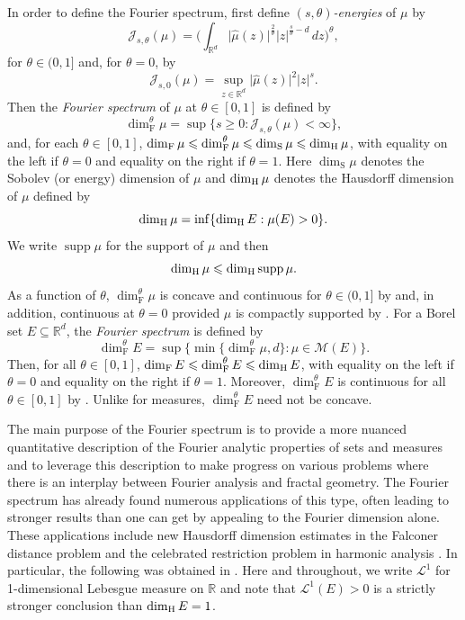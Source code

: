 \documentclass[11pt]{amsart}
\numberwithin{equation}{section}
\newcommand{\rd}{\mathbb{R}^d}
\newcommand{\M}{\mathcal{M}}
\renewcommand{\geq}{\geqslant}
\renewcommand{\leq}{\leqslant}
\newcommand{\hd}{\dim_{\textup{H}}}
\newcommand{\fs}{\dim^\theta_{\mathrm{F}}}
\newcommand{\fd}{\dim_{\mathrm{F}}}
\newcommand{\sd}{\dim_{\mathrm{S}}}
\newcommand{\J}{\mathcal{J}}
\newcommand{\spt}{\operatorname{supp}}
\theoremstyle{plain}
\theoremstyle{remark}
\begin{document}
In order to define the Fourier spectrum,  first define \emph{$(s,\theta)$-energies} of  $\mu$  by
\begin{equation*}
	\J_{s,\theta}(\mu) = \bigg( \int_{\rd} \big| \widehat{\mu}(z) \big|^{\frac{2}{\theta}}|z|^{\frac{s}{\theta}-d}\,dz \bigg)^\theta,
\end{equation*}
for $\theta \in (0,1]$ 
and, for $\theta = 0$, by
\begin{equation*}
	\J_{s,0}(\mu) = \sup_{z\in\rd} \big| \widehat{\mu}(z) \big|^2|z|^{s}.
\end{equation*}
Then the \emph{Fourier spectrum} of $\mu$ at $\theta \in [0,1]$ is defined by
\begin{equation*}
	\fs \mu = \sup\{ s \geq 0 : \J_{s,\theta}(\mu)<\infty \},
\end{equation*}
and, for each $\theta\in[0,1]$, $\fd \mu\leq\fs \mu\leq\sd \mu \leq \hd \mu$, with equality on the left if $\theta= 0$ and equality on the right if $\theta = 1$. Here $\sd \mu$ denotes the Sobolev (or energy) dimension of $\mu$ and $\hd \mu$ denotes the Hausdorff dimension of $\mu$ defined by
\[
\hd \mu = \inf\{ \hd E : \mu(E)>0\}.
\]
We write $\spt \mu$ for the support of $\mu$ and then
\[
\hd \mu \leq \hd \spt \mu.
\]
As a function of $\theta$, $\fs\mu$ is concave and continuous for $\theta\in(0,1]$ by \cite[Theorem~1.1]{JMF} and, in addition,  continuous at $\theta=0$ provided $\mu$ is compactly supported by \cite[Theorem~1.3]{JMF}. For  a Borel set $E\subseteq\rd$, the \emph{Fourier spectrum} is defined by
\begin{equation*}
	\fs  E = \sup\big\{ \min\{\fs \mu, d\} : \mu\in\M(E) \big\}.
\end{equation*}
Then,  for all $\theta\in[0,1]$, $\fd E\leq\fs  E \leq \hd E$, with equality on the left if $\theta= 0$ and equality on the right if $\theta = 1$. Moreover,  $\fs E$ is continuous for all $\theta\in[0,1]$ by \cite[Theorem~1.5]{JMF}.  Unlike for measures, $\fs E$ need not be concave.


The main purpose of the Fourier spectrum is to provide a more nuanced quantitative description of the Fourier analytic properties of sets and measures and to leverage this description to make progress on various problems where there is an interplay between Fourier analysis and fractal geometry.  The Fourier spectrum has already found numerous applications of this type, often leading to  stronger results than one can get by appealing to the Fourier dimension alone.  These applications include new Hausdorff dimension estimates in the Falconer distance problem \cite[Section 7]{JMF} and the celebrated restriction problem in harmonic analysis \cite{restriction}. In particular, the following was obtained in \cite{JMF}.  Here and throughout, we write $\mathcal{L}^1$ for 1-dimensional Lebesgue measure on $\mathbb{R}$ and note that $\mathcal{L}^1(E)>0$ is a strictly stronger conclusion than $\hd E = 1$. 
\end{document}
